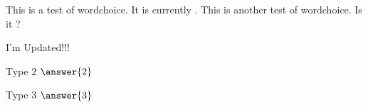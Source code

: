 \documentclass{ximera}
\begin{document}
\begin{exercise}
  This is a test of wordchoice. It is currently
  .  This is
  another test of wordchoice. Is it ?

  I'm Updated!!!
\end{exercise}

\begin{exercise}
  Type $2$ $\answer{2}$
  \begin{hint}
    Type $3$ $\answer{3}$
  \end{hint}
\end{exercise}
\end{document}
